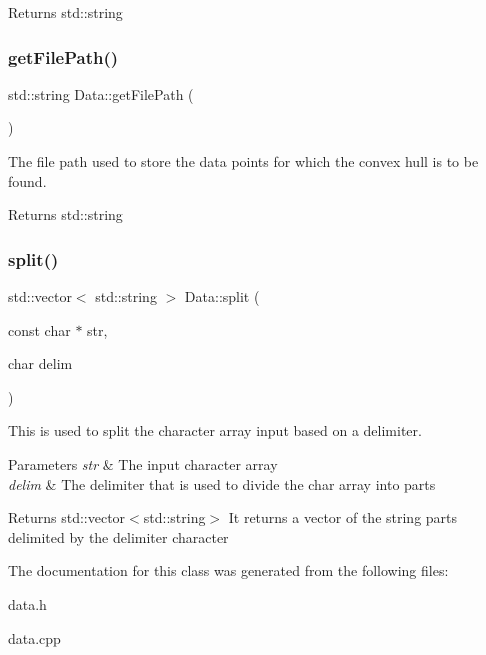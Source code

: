 \begin{DoxyReturn}{Returns}
std\+::string 
\end{DoxyReturn}
\mbox{\label{classData_ac29a8b0190245be5f1cb5f650c16166b}} 
\subsubsection{\texorpdfstring{get\+File\+Path()}{getFilePath()}}
{\footnotesize\ttfamily std\+::string Data\+::get\+File\+Path (\begin{DoxyParamCaption}{ }\end{DoxyParamCaption})}



The file path used to store the data points for which the convex hull is to be found. 

\begin{DoxyReturn}{Returns}
std\+::string 
\end{DoxyReturn}
\mbox{\label{classData_aa8feaee3333daf2ac31c31e171777532}} 
\subsubsection{\texorpdfstring{split()}{split()}}
{\footnotesize\ttfamily std\+::vector$<$ std\+::string $>$ Data\+::split (\begin{DoxyParamCaption}\item[{const char $\ast$}]{str,  }\item[{char}]{delim }\end{DoxyParamCaption})}



This is used to split the character array input based on a delimiter. 


\begin{DoxyParams}{Parameters}
{\em str} & The input character array \\
\hline
{\em delim} & The delimiter that is used to divide the char array into parts \\
\hline
\end{DoxyParams}
\begin{DoxyReturn}{Returns}
std\+::vector$<$std\+::string$>$ It returns a vector of the string parts delimited by the delimiter character 
\end{DoxyReturn}


The documentation for this class was generated from the following files\+:\begin{DoxyCompactItemize}
\item 
data.\+h\item 
data.\+cpp\end{DoxyCompactItemize}
